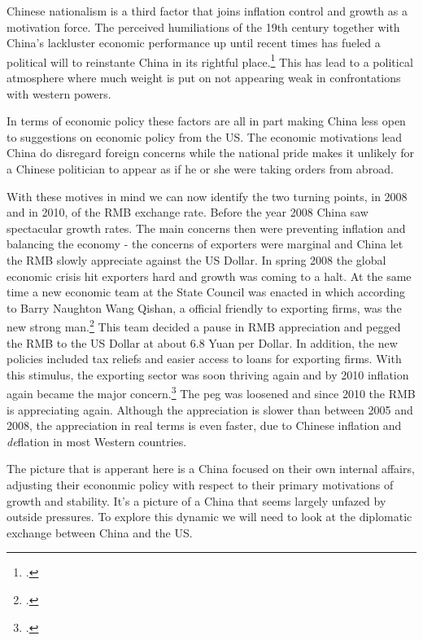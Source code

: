 Chinese nationalism is a third factor that joins inflation control and 
growth as a motivation force. The perceived humiliations of the 19th 
century together with China's lackluster economic performance up until 
recent times has fueled a political will to reinstante China in its 
rightful place.\footnote{\cite{hughes2006}.} This has lead to a political 
atmosphere where much weight is put on not appearing weak in 
confrontations with western powers.

In terms of economic policy these factors are all in part making China
less open to suggestions on economic policy from the US. The economic 
motivations lead China do disregard foreign concerns while the national 
pride makes it unlikely for a Chinese politician to appear as if he or 
she were taking orders from abroad.  

With these motives in mind we can now identify the two turning points, 
in 2008 and in 2010, of the RMB exchange rate. Before the year 2008 
China saw spectacular growth rates.  The main concerns then were 
preventing inflation and balancing the economy - the concerns of 
exporters were marginal and China let the RMB slowly appreciate against 
the US Dollar. In spring 2008 the global economic crisis hit exporters 
hard and growth was coming to a halt. At the same time a new economic 
team at the State Council was enacted in which according to Barry 
Naughton Wang Qishan, a official friendly to exporting firms, was the 
new strong man.\footnote{\cite{naughton2008}.} This team decided a pause 
in RMB appreciation and pegged the RMB to the US Dollar at about 6.8 
Yuan per Dollar. In addition, the new policies included tax reliefs and 
easier access to loans for exporting firms. With this stimulus, the 
exporting sector was soon thriving again and by 2010 inflation again 
became the major concern.\footnote{\cite{Naughton2011}.} The peg was 
loosened and since 2010 the RMB is appreciating again. Although the 
appreciation is slower than between 2005 and 2008, the appreciation in 
real terms is even faster, due to Chinese inflation and \emph{de}flation 
in most Western countries.

The picture that is apperant here is a China focused on their own 
internal affairs, adjusting their econonmic policy with respect to their 
primary motivations of growth and stability. It's a picture of a China 
that seems largely unfazed by outside pressures. To explore this dynamic 
we will need to look at the diplomatic exchange between China and the 
US.
